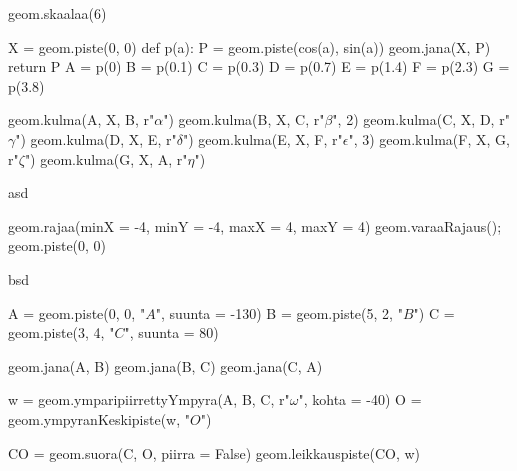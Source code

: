 \begin{kuva}
geom.skaalaa(6)

X = geom.piste(0, 0)
def p(a):
	P = geom.piste(cos(a), sin(a))
	geom.jana(X, P)
	return P
A = p(0)
B = p(0.1)
C = p(0.3)
D = p(0.7)
E = p(1.4)
F = p(2.3)
G = p(3.8)

geom.kulma(A, X, B, r"$\alpha$")
geom.kulma(B, X, C, r"$\beta$", 2)
geom.kulma(C, X, D, r"$\gamma$")
geom.kulma(D, X, E, r"$\delta$")
geom.kulma(E, X, F, r"$\epsilon$", 3)
geom.kulma(F, X, G, r"$\zeta$")
geom.kulma(G, X, A, r"$\eta$")
\end{kuva}

asd

\begin{kuva}
geom.rajaa(minX = -4, minY = -4, maxX = 4, maxY = 4)
geom.varaaRajaus();
geom.piste(0, 0)
\end{kuva}

bsd


\begin{kuva}
A = geom.piste(0, 0, "$A$", suunta = -130)
B = geom.piste(5, 2, "$B$")
C = geom.piste(3, 4, "$C$", suunta = 80)

geom.jana(A, B)
geom.jana(B, C)
geom.jana(C, A)

w = geom.ymparipiirrettyYmpyra(A, B, C, r"$\omega$", kohta = -40)
O = geom.ympyranKeskipiste(w, "$O$")

CO = geom.suora(C, O, piirra = False)
geom.leikkauspiste(CO, w)
\end{kuva}
